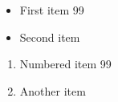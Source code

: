 \documentclass{article}
\begin{document}
\begin{itemize}
\item First item 99
\item Second item
\end{itemize}
\begin{enumerate}
\item Numbered item 99
\item Another item
\end{enumerate}
\end{document}
